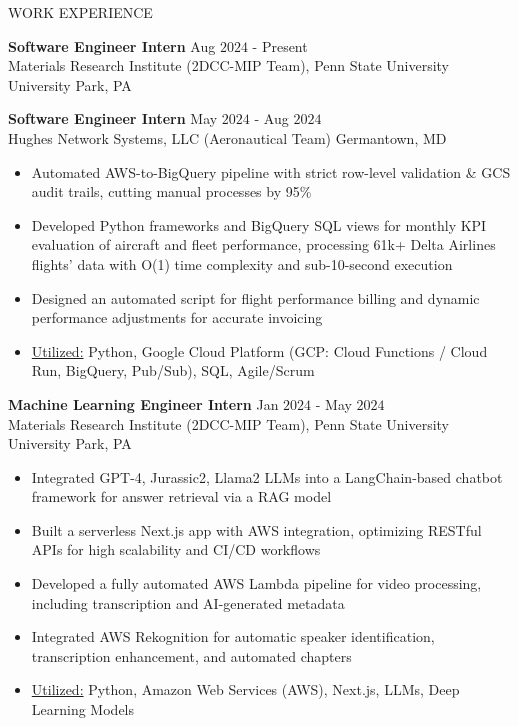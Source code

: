 \documentclass{resume} %
\begin{document}
\begin{rSection}{WORK EXPERIENCE}

{\bf Software Engineer Intern} \hfill Aug $2024$ - Present\\
Materials Research Institute (2DCC-MIP Team), Penn State University \hfill University Park, PA
    
{\bf Software Engineer Intern} \hfill May $2024$ - Aug $2024$\\
Hughes Network Systems, LLC (Aeronautical Team) \hfill Germantown, MD
\begin{itemize}[itemsep = -4pt]
    \item Automated AWS-to-BigQuery pipeline with strict row-level validation \& GCS audit trails, cutting manual processes by 95\%
    \item Developed Python frameworks and BigQuery SQL views for monthly KPI evaluation of aircraft and fleet performance, processing 61k+ Delta Airlines flights' data with O(1) time complexity and sub-10-second execution
    \item Designed an automated script for flight performance billing and dynamic performance adjustments for accurate invoicing
    \item \underline{Utilized:} Python, Google Cloud Platform (GCP: Cloud Functions / Cloud Run, BigQuery, Pub/Sub), SQL, Agile/Scrum
\end{itemize}

{\bf Machine Learning Engineer Intern} \hfill Jan $2024$ - May $2024$\\
Materials Research Institute (2DCC-MIP Team), Penn State University \hfill University Park, PA
\begin{itemize}[itemsep = -4pt]
    \item Integrated GPT-4, Jurassic2, Llama2 LLMs into a LangChain-based chatbot framework for answer retrieval via a RAG model 
    \item Built a serverless Next.js app with AWS integration, optimizing RESTful APIs for high scalability and CI/CD workflows
    \item Developed a fully automated AWS Lambda pipeline for video processing, including transcription and AI-generated metadata
    \item Integrated AWS Rekognition for automatic speaker identification, transcription enhancement, and automated chapters
    \item \underline{Utilized:} Python, Amazon Web Services (AWS), Next.js, LLMs, Deep Learning Models 
\end{itemize}


\end{rSection}
\end{document}
